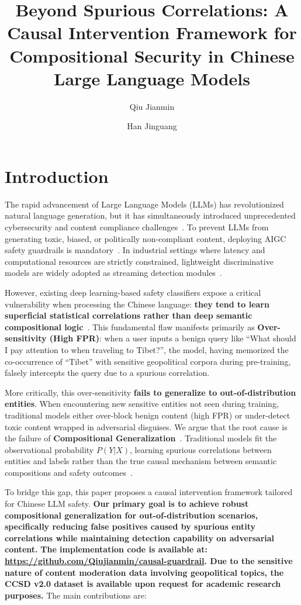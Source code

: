 \documentclass{acmart}
\title{Beyond Spurious Correlations: A Causal Intervention Framework for Compositional Security in Chinese Large Language Models}
\author{Qiu Jianmin}
\author{Han Jinguang}
\affiliation{
\institution{Southeast University}
\country{China}
}
\begin{document}
\maketitle

\section{Introduction}
The rapid advancement of Large Language Models (LLMs) has revolutionized natural language generation, but it has simultaneously introduced unprecedented cybersecurity and content compliance challenges~\cite{bommasani2021opportunities, weidinger2022taxonomy}. To prevent LLMs from generating toxic, biased, or politically non-compliant content, deploying AIGC safety guardrails is mandatory~\cite{zhao2024survey}. In industrial settings where latency and computational resources are strictly constrained, lightweight discriminative models are widely adopted as streaming detection modules~\cite{markov2023holistic}.

However, existing deep learning-based safety classifiers expose a critical vulnerability when processing the Chinese language: \textbf{they tend to learn superficial statistical correlations rather than deep semantic compositional logic}~\cite{bender2021dangers, lin2023compositional}. This fundamental flaw manifests primarily as \textbf{Over-sensitivity (High FPR)}: when a user inputs a benign query like ``What should I pay attention to when traveling to Tibet?'', the model, having memorized the co-occurrence of ``Tibet'' with sensitive geopolitical corpora during pre-training, falsely intercepts the query due to a spurious correlation.

More critically, this over-sensitivity \textbf{fails to generalize to out-of-distribution entities}. When encountering new sensitive entities not seen during training, traditional models either over-block benign content (high FPR) or under-detect toxic content wrapped in adversarial disguises. We argue that the root cause is the failure of \textbf{Compositional Generalization}~\cite{keysers2020measuring}. Traditional models fit the observational probability $P(Y|X)$, learning spurious correlations between entities and labels rather than the true causal mechanism between semantic compositions and safety outcomes~\cite{scholkopf2021toward}.

To bridge this gap, this paper proposes a causal intervention framework tailored for Chinese LLM safety. \textbf{Our primary goal is to achieve robust compositional generalization for out-of-distribution scenarios, specifically reducing false positives caused by spurious entity correlations while maintaining detection capability on adversarial content.} \textbf{The implementation code is available at: \url{https://github.com/Qiujianmin/causal-guardrail}. Due to the sensitive nature of content moderation data involving geopolitical topics, the CCSD v2.0 dataset is available upon request for academic research purposes.} The main contributions are:
\end{document}
